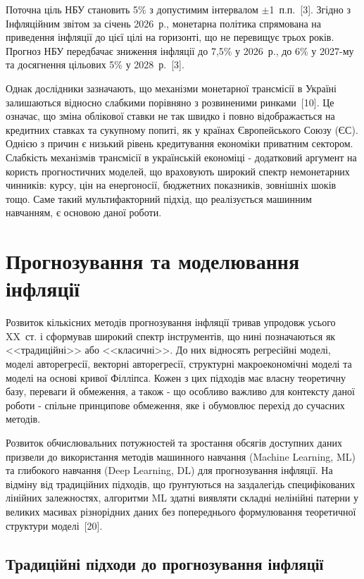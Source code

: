 \documentclass[a4paper,ukrainian,oneside]{extreport}
\begin{document}
Поточна ціль НБУ становить 5\% з допустимим інтервалом $\pm$1~п.п.~[3]. Згідно з Інфляційним звітом за січень 2026~р., монетарна політика спрямована на приведення інфляції до цієї цілі на горизонті, що не перевищує трьох років. Прогноз НБУ передбачає зниження інфляції до 7,5\% у 2026~р., до 6\% у 2027-му та досягнення цільових 5\% у 2028~р.~[3].

Однак дослідники зазначають, що механізми монетарної трансмісії в Україні залишаються відносно слабкими порівняно з розвиненими ринками~[10]. Це означає, що зміна облікової ставки не так швидко і повно відображається на кредитних ставках та сукупному попиті, як у країнах Європейського Союзу (ЄС). Однією з причин є низький рівень кредитування економіки приватним сектором. Слабкість механізмів трансмісії в українській економіці - додатковий аргумент на користь прогностичних моделей, що враховують широкий спектр немонетарних чинників: курсу, цін на енергоносії, бюджетних показників, зовнішніх шоків тощо. Саме такий мультифакторний підхід, що реалізується машинним навчанням, є основою даної роботи.

\section{Прогнозування та моделювання інфляції}

Розвиток кількісних методів прогнозування інфляції тривав упродовж усього XX~ст. і сформував широкий спектр інструментів, що нині позначаються як <<традиційні>> або <<класичні>>. До них відносять регресійні моделі, моделі авторегресії, векторні авторегресії, структурні макроекономічні моделі та моделі на основі кривої Філліпса. Кожен з цих підходів має власну теоретичну базу, переваги й обмеження, а також - що особливо важливо для контексту даної роботи - спільне принципове обмеження, яке і обумовлює перехід до сучасних методів.

Розвиток обчислювальних потужностей та зростання обсягів доступних даних призвели до використання методів машинного навчання (Machine Learning, ML) та глибокого навчання (Deep Learning, DL) для прогнозування інфляції. На відміну від традиційних підходів, що ґрунтуються на заздалегідь специфікованих лінійних залежностях, алгоритми ML здатні виявляти складні нелінійні патерни у великих масивах різнорідних даних без попереднього формулювання теоретичної структури моделі~[20].

\subsection{Традиційні підходи до прогнозування інфляції}
\end{document}
